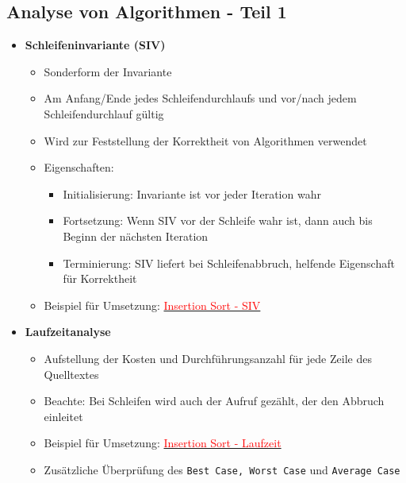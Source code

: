 \subsection{Analyse von Algorithmen - Teil 1} 
    \begin{itemize}

        \item \textbf{Schleifeninvariante (SIV)}
            \begin{itemize}
                \item Sonderform der Invariante 
                \item Am Anfang/Ende jedes Schleifendurchlaufs und vor/nach jedem Schleifendurchlauf gültig
                \item Wird zur Feststellung der Korrektheit von Algorithmen verwendet
                \item Eigenschaften: 
                    \begin{itemize}
                        \item Initialisierung: Invariante ist vor jeder Iteration wahr
                        \item Fortsetzung: Wenn SIV vor der Schleife wahr ist, dann auch bis Beginn der nächsten Iteration
                        \item Terminierung: SIV liefert bei Schleifenabbruch, helfende Eigenschaft für Korrektheit
                    \end{itemize}
                \item Beispiel für Umsetzung: \hyperref[insSortSiv]{\textcolor{red}{Insertion Sort - SIV}}
            \end{itemize}
        
        \item \textbf{Laufzeitanalyse}
            \begin{itemize}
                \item Aufstellung der Kosten und Durchführungsanzahl für jede Zeile des Quelltextes
                \item Beachte: Bei Schleifen wird auch der Aufruf gezählt, der den Abbruch einleitet 
                \item Beispiel für Umsetzung: \hyperref[insSortLaufzeit]{\textcolor{red}{Insertion Sort - Laufzeit}}
                \item Zusätzliche Überprüfung des \texttt{Best Case, Worst Case} und \texttt{Average Case}
            \end{itemize}


\end{itemize}
